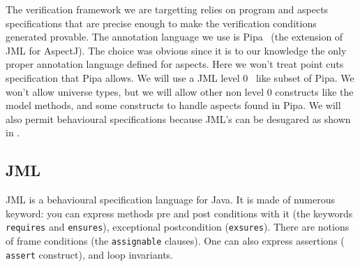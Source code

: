 The verification framework we are targetting relies on program and
aspects specifications that are precise enough to make the
verification conditions generated provable.  The annotation language
we use is Pipa~\cite{ZhaoR03} (the extension of JML for AspectJ).  The
choice was obvious since it is to our knowledge the only proper
annotation language defined for aspects. Here we won't treat point
cuts specification that Pipa allows.  We will use a JML level
0~\cite{Leavens-etal07} like subset of Pipa.  We won't allow universe
types, but we will allow other non level 0 constructs like the model
methods, and some constructs to handle aspects found in Pipa.
We will also permit behavioural specifications because JML's can
be desugared as shown in \cite{RaghavanL00}.

\subsection{JML} 
JML is a behavioural specification language for Java. It is made of
numerous keyword: you can express methods pre and post conditions with
it (the keywords {\tt requires} and {\tt ensures}), exceptional
postcondition ({\tt exsures}). There are notions of frame conditions
(the {\tt assignable} clauses). One can also express assertions ({\tt
assert} construct), and loop invariants.

